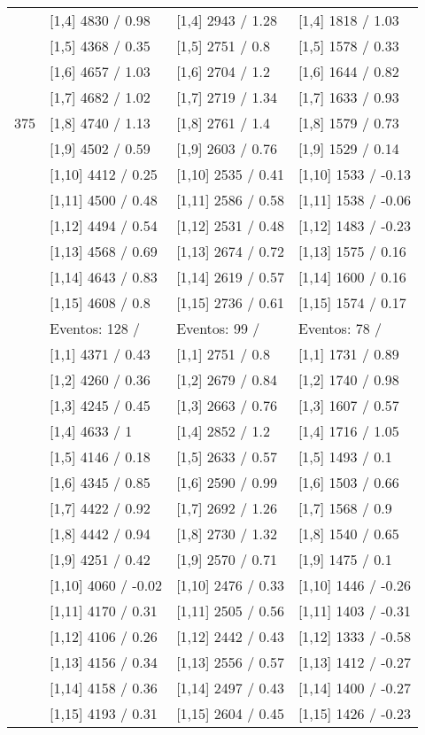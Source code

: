 \begin{table}
\begin{tabular}[t]{llll}
\addlinespace
 & {}[1,4] 4830  / 0.98 & {}[1,4] 2943  / 1.28 & {}[1,4] 1818  / 1.03\\
 & {}[1,5] 4368  / 0.35 & {}[1,5] 2751  / 0.8 & {}[1,5] 1578  / 0.33\\
 & {}[1,6] 4657  / 1.03 & {}[1,6] 2704  / 1.2 & {}[1,6] 1644  / 0.82\\
 & {}[1,7] 4682  / 1.02 & {}[1,7] 2719  / 1.34 & {}[1,7] 1633  / 0.93\\
375 & {}[1,8] 4740  / 1.13 & {}[1,8] 2761  / 1.4 & {}[1,8] 1579  / 0.73\\
\addlinespace
 & {}[1,9] 4502  / 0.59 & {}[1,9] 2603  / 0.76 & {}[1,9] 1529  / 0.14\\
 & {}[1,10] 4412  / 0.25 & {}[1,10] 2535  / 0.41 & {}[1,10] 1533  / -0.13\\
 & {}[1,11] 4500  / 0.48 & {}[1,11] 2586  / 0.58 & {}[1,11] 1538  / -0.06\\
 & {}[1,12] 4494  / 0.54 & {}[1,12] 2531  / 0.48 & {}[1,12] 1483  / -0.23\\
 & {}[1,13] 4568  / 0.69 & {}[1,13] 2674  / 0.72 & {}[1,13] 1575  / 0.16\\
\addlinespace
 & {}[1,14] 4643  / 0.83 & {}[1,14] 2619  / 0.57 & {}[1,14] 1600  / 0.16\\
 & {}[1,15] 4608  / 0.8 & {}[1,15] 2736  / 0.61 & {}[1,15] 1574  / 0.17\\
 & Eventos:  128 / & Eventos:  99 / & Eventos:  78 /\\
 & {}[1,1] 4371  / 0.43 & {}[1,1] 2751  / 0.8 & {}[1,1] 1731  / 0.89\\
 & {}[1,2] 4260  / 0.36 & {}[1,2] 2679  / 0.84 & {}[1,2] 1740  / 0.98\\
\addlinespace
 & {}[1,3] 4245  / 0.45 & {}[1,3] 2663  / 0.76 & {}[1,3] 1607  / 0.57\\
 & {}[1,4] 4633  / 1 & {}[1,4] 2852  / 1.2 & {}[1,4] 1716  / 1.05\\
 & {}[1,5] 4146  / 0.18 & {}[1,5] 2633  / 0.57 & {}[1,5] 1493  / 0.1\\
 & {}[1,6] 4345  / 0.85 & {}[1,6] 2590  / 0.99 & {}[1,6] 1503  / 0.66\\
 & {}[1,7] 4422  / 0.92 & {}[1,7] 2692  / 1.26 & {}[1,7] 1568  / 0.9\\
\addlinespace
500 & {}[1,8] 4442  / 0.94 & {}[1,8] 2730  / 1.32 & {}[1,8] 1540  / 0.65\\
 & {}[1,9] 4251  / 0.42 & {}[1,9] 2570  / 0.71 & {}[1,9] 1475  / 0.1\\
 & {}[1,10] 4060  / -0.02 & {}[1,10] 2476  / 0.33 & {}[1,10] 1446  / -0.26\\
 & {}[1,11] 4170  / 0.31 & {}[1,11] 2505  / 0.56 & {}[1,11] 1403  / -0.31\\
 & {}[1,12] 4106  / 0.26 & {}[1,12] 2442  / 0.43 & {}[1,12] 1333  / -0.58\\
\addlinespace
 & {}[1,13] 4156  / 0.34 & {}[1,13] 2556  / 0.57 & {}[1,13] 1412  / -0.27\\
 & {}[1,14] 4158  / 0.36 & {}[1,14] 2497  / 0.43 & {}[1,14] 1400  / -0.27\\
 & {}[1,15] 4193  / 0.31 & {}[1,15] 2604  / 0.45 & {}[1,15] 1426  / -0.23\\
\bottomrule
\end{tabular}
\end{table}
